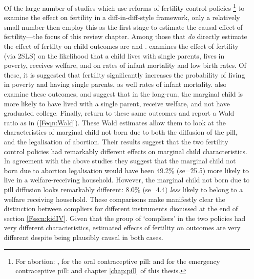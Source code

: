 Of the large number of studies which use reforms of fertility-control policies%
\footnote{For abortion: \citet{Ananatetal2007,Ananatetal2009,AngristEvans1996,
CharlesStephens2006,Cookeetal1999,Currieetal1996,Gruberetal1999,Guldi2008,
KaneStaiger1996,Levineetal1996,Levineetal1996b,Levineetal1999,PopEleches2005,
PopEleches2006}, for the oral contraceptive pill: \citet{OltmansHungerman2012,
Bailey2006,Bailey2011,Bailey2012,Bailey2013,Christensen2012,Goldin2006,
GoldinKatz2002a,GoldinKatz2002b,KearnerLevine2009} and for the emergency 
contraceptive pill: \citet{Durrance2013,Grossetal2014} and chapter 
\ref{chap:pill} of this thesis.} to examine the effect on fertility in a 
diff-in-diff-style framework, only a relatively small number then employ this 
as the first stage to estimate the causal effect of fertility---the focus of
this review chapter.  Among those that \emph{do} directly estimate the effect
of fertilty on child outcomes are \citet{Gruberetal1999,Ananatetal2009} and
\citet{OltmansHungerman2012}. \citet{Gruberetal1999} examines the effect of 
fertility (via 2SLS) on the likelihood that a child lives with single parents, 
lives in poverty, receives welfare, and on rates of infant mortality and low 
birth rates.  Of these, it is suggested that fertility significantly increases 
the probability of living in poverty and having single parents, as well rates 
of infant mortality. \citet{Ananatetal2009} also examine these outcomes, and 
suggest that in the long-run, the marginal child is more likely to have lived 
with a single parent, receive welfare, and not have graduated college.
Finally, \citet{OltmansHungerman2012} return to these same outcomes and report
a Wald ratio as in (\ref{Feqn:Wald}).  These Wald estimates allow them to look
at the characteristics of marginal child not born due to both the diffusion of 
the pill, and the legalisation of abortion.  Their results suggest that the two 
fertility control policies had remarkably different effects on marginal child 
characteristics.  In agreement with the above studies they suggest that the
marginal child not born due to abortion legalisation would have been 49.2\%
(se=25.5) more likely to live in a welfare-receiving household.  However, the 
marginal child not born due to pill diffusion looks remarkably different: 8.0\% 
(se=4.4) \emph{less} likely to belong to a welfare receiving household.  These 
comparisons make manifestly clear the distinction between compliers for 
different instruments discussed at the end of section \ref{Fsscn:kidIV}.
Given that the group of `compliers' in the two policies had very different
characteristics, estimated effects of fertility on outcomes are very different
despite being plausibly causal in both cases.

